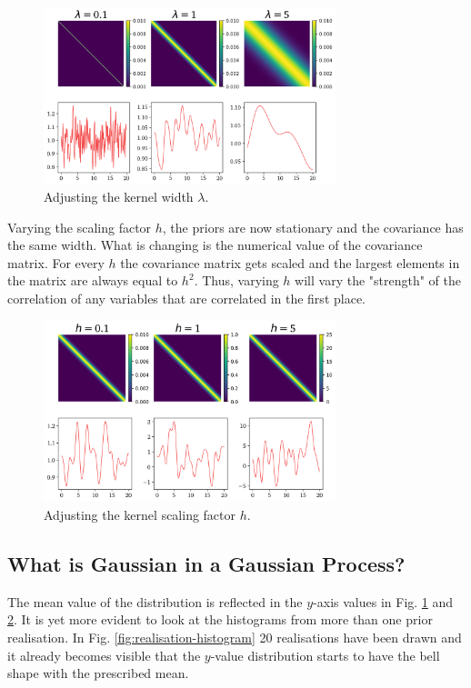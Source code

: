 \documentclass[10pt,twocolumn]{article}
\begin{document}
\begin{figure}[H]
\centering\includegraphics[width=8.5cm]{cov-Kernel-SE-changing-lambda-tex.png}
\caption{Adjusting the kernel width $\lambda$.}
\label{fig:SE-kernel-width}
\end{figure}

Varying the scaling factor $h$, the priors are now stationary and the covariance has the same width. What is changing is the numerical value of the covariance matrix. For every $h$ the covariance matrix gets scaled and the largest elements in the matrix are always equal to $h^2$. Thus, varying $h$  will vary the "strength" of the correlation of any variables that are correlated in the first place.

\begin{figure}[H]
\centering\includegraphics[width=8.5cm]{cov-Kernel-SE-changing-h-tex.png}
\caption{Adjusting the kernel scaling factor $h$.}
\label{fig:SE-kernel-scaling-factor}
\end{figure}

\subsection{What is Gaussian in a Gaussian Process?}

The mean value of the distribution is reflected in the $y$-axis values in Fig. \ref{fig:SE-kernel-width} and \ref{fig:SE-kernel-scaling-factor}. It is yet more evident to look at the histograms from more than one prior realisation. In Fig. \ref{fig:realisation-histogram} 20 realisations have been drawn and it already becomes visible that the $y$-value distribution starts to have the bell shape with the prescribed mean.
\end{document}

